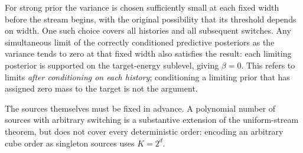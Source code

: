 For strong prior the variance is chosen sufficiently small at each fixed
width before the stream begins, with the original possibility that its
threshold depends on width. One such choice covers all histories and
all subsequent switches. Any simultaneous limit of the correctly
conditioned predictive posteriors as the variance tends to zero at that
fixed width also satisfies the result: each limiting posterior is
supported on the target-energy sublevel, giving $\beta=0$. This refers
to limits \emph{after conditioning on each history}; conditioning a
limiting prior that has assigned zero mass to the target is not the
argument.

The sources themselves must be fixed in advance. A polynomial number of
sources with arbitrary switching is a substantive extension of the
uniform-stream theorem, but does not cover every deterministic order:
encoding an arbitrary cube order as singleton sources uses $K=2^d$.
